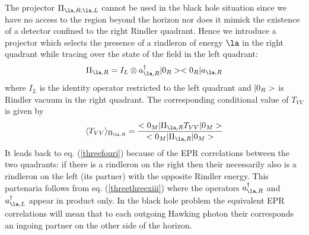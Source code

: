 The projector $\Pi_{\la,R;\la,L}$
cannot be used in the black hole situation since we have no access to the
region beyond the horizon nor does it mimick the existence of a
detector confined to the right Rindler quadrant. Hence
we introduce a projector which selects the presence of a rindleron
of energy $\la$ in the right quadrant  while tracing over the state of the
field in the left quadrant:
\begin{equation}
\Pi_{\la,R} =  I_{L} \otimes
a^\dagger_{\la,R}  \ket{0_{R}}\bra{0_{R}} a_{\la,R}
 \label{threefourv} \end{equation}
where $I_{{L }}$ is the identity operator restricted to the left
quadrant and $\mbox{$ \vert 0_{R } > $}$ is Rindler vacuum in the right
quadrant. The
corresponding conditional value of $T_{VV}$ is given by
\begin{equation}
\langle T_{VV} \rangle _{\Pi_{\la,R}}= {
\expect {0_M}{\Pi_{\la,R} T_{VV}}{0_M} \over  \expect {0_M}{\Pi_{\la,R}}{0_M} }
\label{threefourvi} \end{equation} It leads back
 to eq. (\ref{threefouri}) because of the EPR correlations between the two
quadrants: if there is a rindleron on the right then their
necessarily also is a rindleron on
the left (its partner) with the
opposite
 Rindler
energy. This partenaria follows from eq. (\ref{threethreexiii}) where
the operators
$a^\dagger_{\la,R}$ and $a^\dagger_{\la,L}$
appear
 in product only.
 In the
black hole problem
the equivalent
EPR correlations will mean that
 to each outgoing Hawking photon their
corresponds an ingoing partner on the other side of the horizon.

